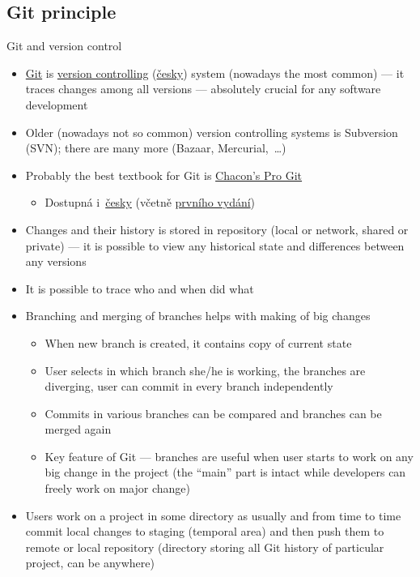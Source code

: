 \documentclass[compress, xelatex, 11pt, xcolor=svgnames, aspectratio=169,
	hyperref={
		bookmarks=true,
		unicode=true,
		colorlinks=true,
		pdftitle={Linux, command line and MetaCentrum},
		plainpages=false,
		pdfauthor={Vojtech Zeisek},
		pdfsubject={Course about use of Linux command line, writing shell scripts and using MetaCentrum of CESNET},
		pdfcreator={XeLaTeX},
		pdfkeywords={Linux, GNU, BASH, shell, command line, MetaCentrum},
		linkcolor=DarkRed, %
		anchorcolor=DarkBlue, %
		citecolor=Indigo, %
		filecolor=NavyBlue, %
		menucolor=DarkMagenta, %
		urlcolor=DarkBlue, %
		},
	url={hyphens, lowtilde} %
	]{beamer}
\begin{document}
\subsection{Git principle}

\begin{frame}[allowframebreaks]{Git and version control}
	\begin{itemize}
		\item \href{https://git-scm.com/}{Git} is \href{https://en.wikipedia.org/wiki/Version_control}{version controlling} (\href{https://cs.wikipedia.org/wiki/Verzov\%C3\%A1n\%C3\%AD}{česky}) system (nowadays the most common) --- it traces changes among all versions --- absolutely crucial for any software development
		\item Older (nowadays not so common) version controlling systems is Subversion (SVN); there are many more (Bazaar, Mercurial,~\ldots)
		\item Probably the best textbook for Git is \href{https://git-scm.com/book/en/v2}{Chacon's Pro Git}
		\begin{itemize}
			\item Dostupná i~\href{https://git-scm.com/book/cs/v2}{česky} (včetně \href{https://knihy.nic.cz/cs/detail/2/}{prvního vydání})
		\end{itemize}
		\item Changes and their history is stored in repository (local or network, shared or private) --- it is possible to view any historical state and differences between any versions
		\item It is possible to trace who and when did what
		\item Branching and merging of branches helps with making of big changes
		\begin{itemize}
			\item When new branch is created, it contains copy of current state
			\item User selects in which branch she/he is working, the branches are diverging, user can commit in every branch independently
			\item Commits in various branches can be compared and branches can be merged again
			\item Key feature of Git --- branches are useful when user starts to work on any big change in the project (the \enquote{main} part is intact while developers can freely work on major change)
		\end{itemize}
		\item Users work on a project in some directory as usually and from time to time commit local changes to staging (temporal area) and then push them to remote or local repository (directory storing all Git history of particular project, can be anywhere)

\end{itemize}
\end{frame}
\end{document}
